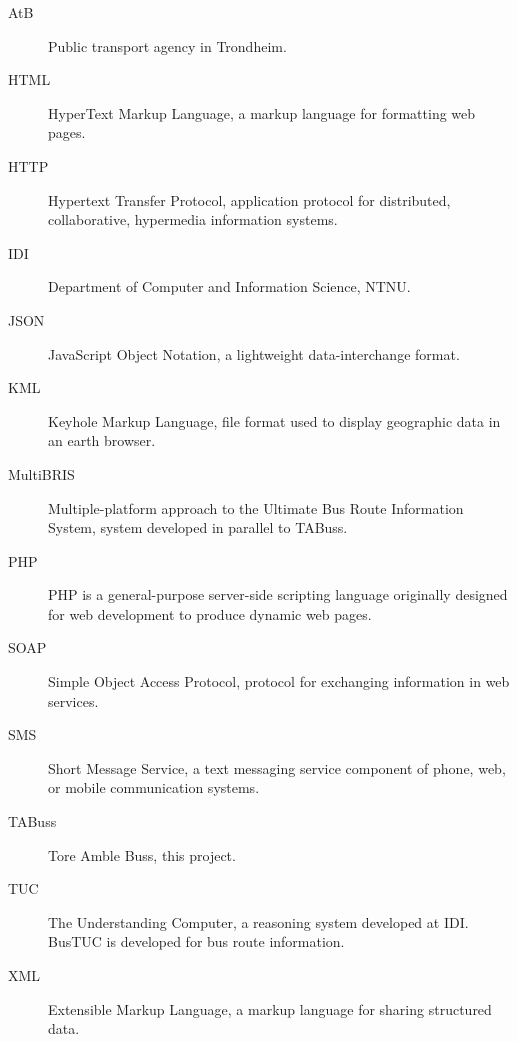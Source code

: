 \begin{description}
\item[AtB]
Public transport agency in Trondheim.
\item[HTML]
HyperText Markup Language, a markup language for formatting web pages.
\item[HTTP]
Hypertext Transfer Protocol, application protocol for distributed, collaborative, hypermedia information systems.
\item[IDI]
Department of Computer and Information Science, NTNU.
\item[JSON]
JavaScript Object Notation, a lightweight data-interchange format.
\item[KML]
Keyhole Markup Language, file format used to display geographic data in an earth browser.
\item[MultiBRIS]
Multiple-platform approach to the Ultimate Bus Route Information System, system developed in parallel to TABuss.
\item[PHP]
PHP is a general-purpose server-side scripting language originally designed for web development to produce dynamic web pages.
\item[SOAP]
Simple Object Access Protocol, protocol for exchanging information in web services.
\item[SMS]
Short Message Service, a text messaging service component of phone, web, or mobile communication systems.
\item[TABuss]
Tore Amble Buss, this project.
\item[TUC] 
The Understanding Computer, a reasoning system developed at IDI. BusTUC is developed for bus route information.
\item[XML]
Extensible Markup Language, a markup language for sharing structured data.
\end{description}
